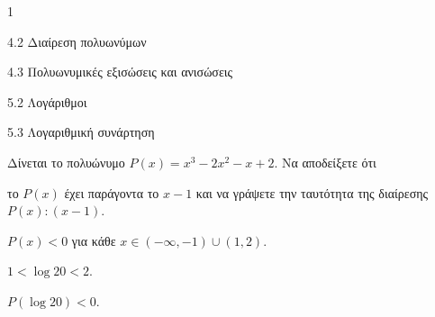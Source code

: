 \begin{ylh}{1}
\item 4.2 Διαίρεση πολυωνύμων
\item 4.3 Πολυωνυμικές εξισώσεις και ανισώσεις
\item 5.2 Λογάριθμοι
\item 5.3 Λογαριθμική συνάρτηση
\end{ylh}
Δίνεται το πολυώνυμο $P(x) = x^3 - 2x^2 - x + 2$. Να αποδείξετε ότι
\begin{alist}
\item το $P(x)$ έχει παράγοντα το $x - 1$ και να γράψετε την ταυτότητα της διαίρεσης $P(x) : (x - 1)$.
\item $P(x) < 0$ για κάθε $x \in (-\infty, -1) \cup (1, 2)$.
\item $1 < \log 20 < 2$.
\item $P(\log 20) < 0$.
\end{alist}

